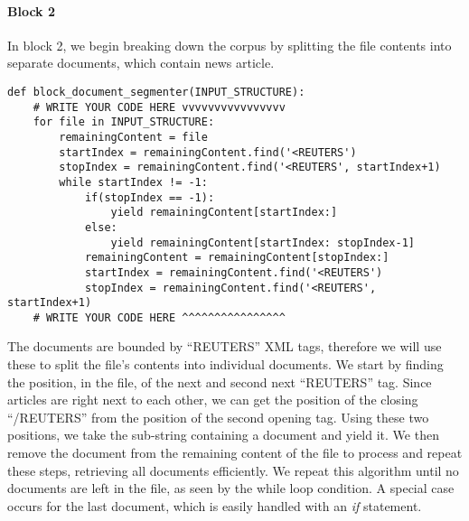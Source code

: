 \documentclass[]{report}
\begin{document}
\paragraph{Block 2}
In block 2, we begin breaking down the corpus by splitting the file contents into separate documents, which contain news article.
\begin{verbatim}
def block_document_segmenter(INPUT_STRUCTURE):
	# WRITE YOUR CODE HERE vvvvvvvvvvvvvvvv
	for file in INPUT_STRUCTURE:
		remainingContent = file
		startIndex = remainingContent.find('<REUTERS')
		stopIndex = remainingContent.find('<REUTERS', startIndex+1)
		while startIndex != -1:
			if(stopIndex == -1):
				yield remainingContent[startIndex:]
			else:
				yield remainingContent[startIndex: stopIndex-1]
			remainingContent = remainingContent[stopIndex:]
			startIndex = remainingContent.find('<REUTERS')
			stopIndex = remainingContent.find('<REUTERS', startIndex+1)
	# WRITE YOUR CODE HERE ^^^^^^^^^^^^^^^^
\end{verbatim}
The documents are bounded by ``\textlangle REUTERS\textrangle'' XML tags, therefore we will use these to split the file's contents into individual documents. We start by finding the position, in the file, of the next and second next ``\textlangle REUTERS\textrangle'' tag. Since articles are right next to each other, we can get the position of the closing ``\textlangle/REUTERS\textrangle'' from the position of the second opening tag. Using these two positions, we take the sub-string containing a document and yield it. We then remove the document from the remaining content of the file to process and repeat these steps, retrieving all documents efficiently. We repeat this algorithm until no documents are left in the file, as seen by the while loop condition. A special case occurs for the last document, which is easily handled with an \textit{if} statement.

\newpage
\end{document}

